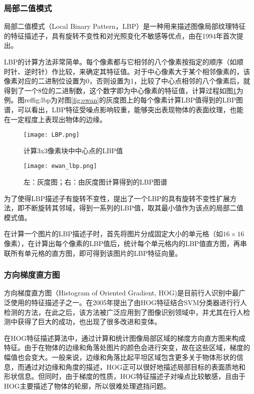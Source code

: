 \subsubsection{局部二值模式}

  局部二值模式（Local Binary Pattern，LBP）是一种用来描述图像局部纹理特征的特征描述子，具有旋转不变性和对光照变化不敏感等优点，由\citet{ojala1994performance}在1994年首次提出。

  LBP的计算方法非常简单。每个像素都与它相邻的八个像素按指定的顺序（如顺时针、逆时针）作比较，来确定其特征值。对于中心像素大于某个相邻像素的，该像素对应的二进制位设置为0，否则设置为1，比较了中心点相邻的八个像素后，就得到了一个8位的二进制数，这个数字即为中心像素的特征值，计算过程如图\ref{fig:lbp_procedure}为例。图ref{fig:lbp}为对图\ref{fig:ewan}的灰度图上的每个像素计算LBP值得到的LBP图谱，可以看出，LBP特征受噪点影响较重，能够突出表现物体的表面纹理，也能在一定程度上表现出物体的边缘。

\begin{figure}[htb]
  \centering
  \texttt{[image: LBP.png]}
  \caption{计算3x3像素块中中心点的LBP值}
  \label{fig:lbp_procedure}
\end{figure}

\begin{figure}[htb]
  \centering
  \texttt{[image: ewan\_lbp.png]}
  \caption{左：灰度图；右：由灰度图计算得到的LBP图谱}
  \label{fig:lbp}
\end{figure}

  为了使得LBP描述子有旋转不变性，\citet{ojala2002multiresolution}提出了一个LBP的具有旋转不变性扩展方法，即不断旋转其邻域，得到一系列的LBP值，取其最小值作为该点的局部二值模式值。

  在计算一个图片的LBP描述子时，首先将图片分成固定大小的单元格（如$16\times16$像素），在计算出每个像素的LBP值后，统计每个单元格内的LBP值直方图，再串联所有单元格的直方图，即可得到该图片的LBP特征向量。

\subsubsection{方向梯度直方图}

  方向梯度直方图（Histogram of Oriented Gradient, HOG)是目前行人识别中最广泛使用的特征描述子之一。\citet{dalal2005histograms}在2005年提出了由HOG特征结合SVM分类器进行行人检测的方法，在此之后，该方法被广泛应用到了图像识别领域中，并尤其在行人检测中获得了巨大的成功，也出现了很多改进和变体。

  在HOG特征描述算法中，通过计算和统计图像局部区域的梯度方向直方图来构成特征。由于在物体的边缘和角落处图片的颜色会进行突变，故在这些区域，梯度的幅值也会变大。一般来说，边缘和角落比起平坦区域包含更多关于物体形状的信息，而通过对边缘和角度的描述，HOG正可以很好地描述局部目标的表面质地和形状信息。但同时，由于梯度的性质，HOG特征描述子对噪点比较敏感，且由于HOG主要描述了物体的轮廓，所以很难处理遮挡问题。


